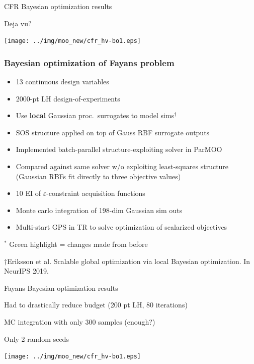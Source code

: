 \documentclass[aspectratio=169]{beamer}
\begin{document}
\begin{frame}{CFR Bayesian optimization results}

Deja vu?\\
\begin{center}
\texttt{[image: ../img/moo\_new/cfr\_hv-bo1.eps]}
\end{center}
\end{frame}

\begin{frame}\frametitle{Bayesian optimization of Fayans problem}
\begin{itemize}
\item 13 continuous design variables
\item 2000-pt LH design-of-experiments
\item Use {\bf local} Gaussian proc.\ surrogates to model sims$^\dagger$
\item SOS structure applied on top of Gauss RBF surrogate outputs
\item Implemented batch-parallel
{\color{blue} structure-exploiting solver in ParMOO}
\item Compared against
{\color{red} same solver w/o exploiting least-squares structure}
(Gaussian RBFs fit directly to three objective values)
\item {\color{green}10 EI of $\varepsilon$-constraint acquisition functions}
\item {\color{green}Monte carlo integration of 198-dim Gaussian sim outs}
\item {\color{green}Multi-start GPS in TR to solve optimization of scalarized objectives}
\end{itemize}

\bigskip

$^*${\color{green} Green highlight} = changes made from before

\vfill

{\tiny\sl

$\dagger$Eriksson et al.
Scalable global optimization via local Bayesian optimization.
In NeurIPS 2019.

}
\end{frame}

\begin{frame}{Fayans Bayesian optimization results}

Had to drastically reduce budget (200 pt LH, 80 iterations)

\medskip

MC integration with only 300 samples (enough?)

\medskip

Only 2 random seeds

\medskip

\begin{center}
\texttt{[image: ../img/moo\_new/cfr\_hv-bo1.eps]}
\end{center}
\end{frame}
\end{document}
